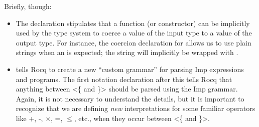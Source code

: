 \documentclass[12pt]{report}
\begin{document}
    Briefly, though:

\begin{itemize}
\item  The  declaration stipulates that a function (or
         constructor) can be implicitly used by the type system to
         coerce a value of the input type to a value of the output
         type.  For instance, the coercion declaration for 
         allows us to use plain strings when an  is expected;
         the string will implicitly be wrapped with .

\item  {}    tells Rocq to create a new ``custom
         grammar'' for parsing Imp expressions and programs. The first
         notation declaration after this tells Rocq that anything
         between <\{ and \}> should be parsed using the Imp
         grammar. Again, it is not necessary to understand the
         details, but it is important to recognize that we are
         defining \textit{new} interpretations for some familiar operators
         like +, -, \ensuremath{\times}, =, \ensuremath{\le}, etc., when they occur between
         <\{ and \}>. 

\end{itemize}
\end{document}
